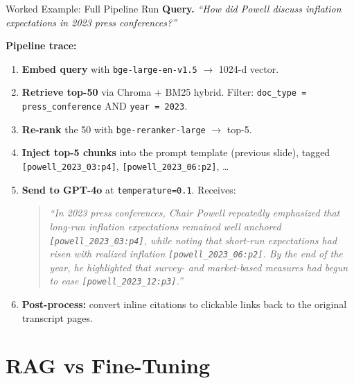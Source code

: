 \documentclass[10pt,english,aspectratio=169]{beamer}
\begin{document}
\begin{frame}{Worked Example: Full Pipeline Run}
\textbf{Query.} \emph{``How did Powell discuss inflation expectations in 2023 press conferences?''}

\medskip
\textbf{Pipeline trace:}
\begin{enumerate}
\item \textbf{Embed query} with \texttt{bge-large-en-v1.5} $\to$ 1024-d vector.
\medskip
\item \textbf{Retrieve top-50} via Chroma + BM25 hybrid. Filter: \texttt{doc\_type = press\_conference} AND \texttt{year = 2023}.
\medskip
\item \textbf{Re-rank} the 50 with \texttt{bge-reranker-large} $\to$ top-5.
\medskip
\item \textbf{Inject top-5 chunks} into the prompt template (previous slide), tagged \texttt{[powell\_2023\_03:p4]}, \texttt{[powell\_2023\_06:p2]}, \dots
\medskip
\item \textbf{Send to GPT-4o} at \texttt{temperature=0.1}. Receives:
\begin{quote}
\small\itshape
``In 2023 press conferences, Chair Powell repeatedly emphasized that long-run inflation expectations remained well anchored \texttt{[powell\_2023\_03:p4]}, while noting that short-run expectations had risen with realized inflation \texttt{[powell\_2023\_06:p2]}. By the end of the year, he highlighted that survey- and market-based measures had begun to ease \texttt{[powell\_2023\_12:p3]}.''
\end{quote}
\medskip
\item \textbf{Post-process:} convert inline citations to clickable links back to the original transcript pages.
\end{enumerate}
\end{frame}

\section{RAG vs Fine-Tuning}
\end{document}
